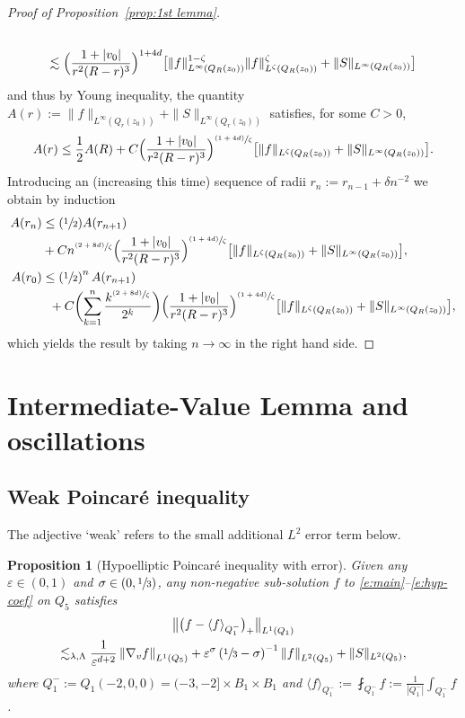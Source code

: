 \documentclass[10pt]{amsart}
\newcommand{\Psfrac}[2]{(\sfrac{#1}{#2})}
\newcommand{\psfrac}[2]{\sfrac{(#1)}{#2}}
\newcommand{\bnorm}[1]{\bigl\| #1 \bigr\|}
\newcommand{\nnorm}[1]{\| #1\|}
\newtheorem{proposition}[theorem]{Proposition}
\theoremstyle{definition}
\theoremstyle{remark}
\newcommand{\norm}[1]{\left\| #1 \right\|}
\let\var\varepsilon
\begin{document}
\begin{proof}[Proof of Proposition~\ref{prop:1st lemma}]
\begin{multline*}
\\
\lesssim \Bigl( \frac{1+|v_0|}{r^2(R-r)^3}
\Bigr)^{1+4d} \bigl[ \|f\|_{L^\infty(Q_R(z_0))}^{1-\zeta}
\|f\|_{L^\zeta(Q_R(z_0))}^\zeta +
\|S\|_{L^\infty(Q_R(z_0))}\bigr]
\end{multline*}
and thus by Young inequality, the quantity $A(r) :=
\|f\|_{L^\infty(Q_r(z_0))} + \|S\|_{L^\infty(Q_r(z_0))}$ satisfies,
for some $C>0$,
\begin{align*}
A(r) \le \frac12 A(R) + C \Bigl( \frac{1+|v_0|}{r^2(R-r)^3}
\Bigr)^{\psfrac{1+4d}{\zeta}} \bigl[ \|f\|_{L^\zeta(Q_R(z_0))} +
\|S\|_{L^\infty(Q_R(z_0))}\bigr].
\end{align*}
Introducing an (increasing this time) sequence of radii
$r_n := r_{n-1} + \delta n^{-2}$ we obtain by induction
\begin{align*}
A(r_n) &\le \Psfrac12 A(r_{n+1})\\
& + C n^{\psfrac{2+8d}{\zeta}}
\Bigl( \frac{1+|v_0|}{r^2(R-r)^3}
\Bigr)^{\psfrac{1+4d}{\zeta}} \bigl[ \|f\|_{L^\zeta(Q_R(z_0))} +
\|S\|_{L^\infty(Q_R(z_0))} \bigr], \\
A(r_0) &\le \left( \sfrac12 \right)^n A(r_{n+1}) \\
& \hspace{2mm}+
C \biggl( \sum_{k=1}^n \frac{k^{\psfrac{2+8d}{\zeta}}}{2^k} \biggr)
\Bigl( \frac{1+|v_0|}{r^2(R-r)^3}
\Bigr)^{\psfrac{1+4d}{\zeta}} \bigl[ \|f\|_{L^\zeta(Q_R(z_0))} +
\|S\|_{L^\infty(Q_R(z_0))}\bigr],
\end{align*}
which yields the result by taking $n \to \infty$ in the right
hand side.
\end{proof}

\section{Intermediate-Value Lemma and oscillations}

\subsection{Weak Poincaré inequality}

The adjective `weak' refers to the small additional $L^2$ error
term below.

\begin{proposition}[Hypoelliptic Poincaré inequality with error]
\label{p:HPI lemma}
Given any $\var\in (0,1)$ and $\sigma \in (0,\sfrac13)$, any
non-negative sub-solution $f$ to
\eqref{e:main}--\eqref{e:hyp-coef} on $Q_5$ satisfies
\begin{multline}
\label{HPI inequality}
\bnorm{\bigl(f-\langle f
\rangle_{Q_1^{-}} \bigr)_+}_{L^{1}(Q_1)}\\
\lesssim_{\lambda,\Lambda}
\frac{1}{\varepsilon^{d+2}} \norm{\nabla_v f}_{L^1 (Q_5)}
+ \varepsilon^\sigma \left(
\sfrac13 - \sigma \right)^{-1} \norm{f}_{L^2(Q_5)} +
\nnorm{S}_{L^2(Q_5)},
\end{multline}
where $Q_1^- := Q_1(-2,0,0) = (-3,-2] \times B_1 \times B_1$
and
$\langle f \rangle_{Q_1^{-}} := \fint_{Q_1^-} f :=
\frac{1}{|Q_1^-|} \int_{Q_1^-} f$.
\end{proposition}
\end{document}
